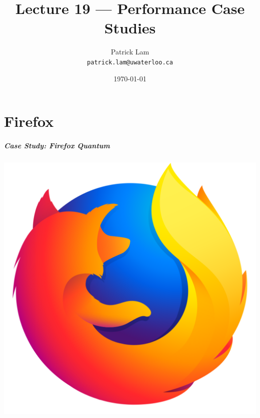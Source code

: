

\title{Lecture 19 --- Performance Case Studies}

\author{Patrick Lam \\ \small \texttt{patrick.lam@uwaterloo.ca}}
\date{\today}




\begin{frame}
  \titlepage

\end{frame}


\part{Firefox}

\begin{frame}
\frametitle{Case Study: Firefox Quantum}

\begin{center}
\includegraphics[width=.6\textwidth]{images/L19-logo-quantum.png}
\end{center}

\end{frame}

